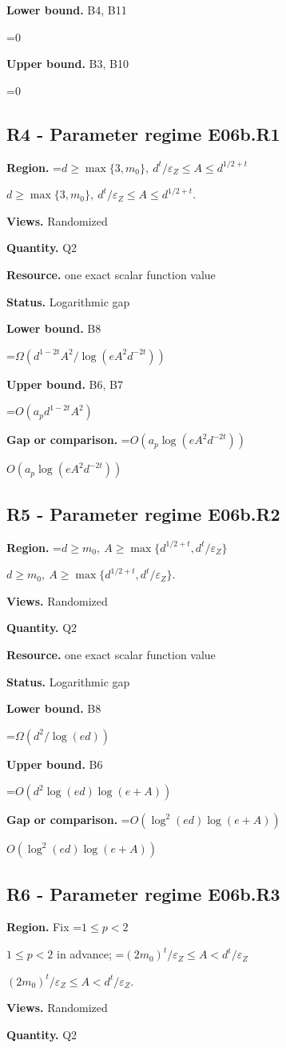 \documentclass[10pt,a4paper]{article}
\newcommand{\AtlasMath}[1]{\par\begingroup\centering\setbox0=\hbox{$\displaystyle #1$}\ifdim\wd0>1.4\linewidth\typeout{ATLAS WIDE FORMULA: \the\wd0}\fi\ifdim\wd0>\linewidth\resizebox{\linewidth}{!}{\box0}\else\box0\fi\par\endgroup}
\newcommand{\AtlasInlineMath}[1]{\begingroup\setbox0=\hbox{$#1$}\ifdim\wd0>.4\linewidth\endgroup\AtlasMath{#1}\else\endgroup$#1$\fi}
\begin{document}
\textbf{Lower bound.} B4, B11

\AtlasMath{0}
\textbf{Upper bound.} B3, B10

\AtlasMath{0}
\subsection{R4 - Parameter regime E06b.R1}
\textbf{Region.} \AtlasInlineMath{d\ge\max\{3,m_0\},\ d^t/\varepsilon_Z\le A\le d^{1/2+t}}.

\textbf{Views.} Randomized

\textbf{Quantity.} Q2

\textbf{Resource.} one exact scalar function value

\textbf{Status.} Logarithmic gap

\textbf{Lower bound.} B8

\AtlasMath{\Omega(d^{1-2t}A^2/\log(eA^2d^{-2t}))}
\textbf{Upper bound.} B6, B7

\AtlasMath{O(a_p d^{1-2t}A^2)}
\textbf{Gap or comparison.} \AtlasInlineMath{O(a_p\log(eA^2d^{-2t}))}

\subsection{R5 - Parameter regime E06b.R2}
\textbf{Region.} \AtlasInlineMath{d\ge m_0,\ A\ge\max\{d^{1/2+t},d^t/\varepsilon_Z\}}.

\textbf{Views.} Randomized

\textbf{Quantity.} Q2

\textbf{Resource.} one exact scalar function value

\textbf{Status.} Logarithmic gap

\textbf{Lower bound.} B8

\AtlasMath{\Omega(d^2/\log(ed))}
\textbf{Upper bound.} B6

\AtlasMath{O(d^2\log(ed)\log(e+A))}
\textbf{Gap or comparison.} \AtlasInlineMath{O(\log^2(ed)\log(e+A))}

\subsection{R6 - Parameter regime E06b.R3}
\textbf{Region.} Fix \AtlasInlineMath{1\le p<2} in advance; \AtlasInlineMath{(2m_0)^t/\varepsilon_Z\le A<d^t/\varepsilon_Z}.

\textbf{Views.} Randomized

\textbf{Quantity.} Q2
\end{document}
